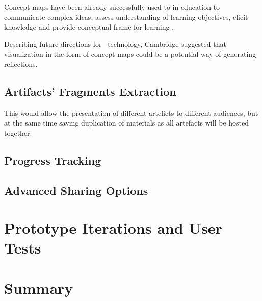 Concept maps have been already successfully used to in education to communicate
complex ideas, assess understanding of learning objectives, elicit knowledge and
provide conceptual frame for learning \citep{Novak2010}.


Describing future directions for \ep~technology, Cambridge
\citeyearpar{Cambridge2010} suggested that visualization in the form of concept
maps could be a potential way of generating reflections.

\subsection{Artifacts' Fragments Extraction}

This would allow the presentation of different arteficts to different audiences,
but at the same time saving duplication of materials as all artefacts will be
hosted together.

\subsection{Progress Tracking}

\subsection{Advanced Sharing Options}

\section{Prototype Iterations and User Tests}
 
\section{Summary}
